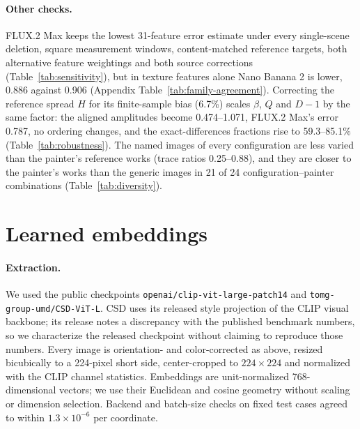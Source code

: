 \paragraph{Other checks.} FLUX.2 Max keeps the lowest 31-feature error estimate under every
single-scene deletion, square measurement windows, content-matched reference targets, both
alternative feature weightings and both source corrections (Table~\ref{tab:sensitivity}),
but in texture features alone Nano Banana 2 is lower, 0.886 against 0.906 (Appendix
Table~\ref{tab:family-agreement}). Correcting the reference spread $H$ for its finite-sample bias
(6.7\%) scales $\beta$, $Q$ and $D-1$ by the same factor: the aligned amplitudes become
0.474--1.071, FLUX.2 Max's error 0.787, no ordering changes, and the exact-differences fractions
rise to 59.3--85.1\% (Table~\ref{tab:robustness}). The named images of every configuration
are less varied than the painter's reference works (trace ratios 0.25--0.88), and they are closer
to the painter's works than the generic images in 21 of 24 configuration--painter combinations
(Table~\ref{tab:diversity}).

\FloatBarrier
\section{Learned embeddings}\label{app:learned}

\paragraph{Extraction.} We used the public checkpoints
\texttt{openai/\allowbreak clip-\allowbreak vit-\allowbreak large-\allowbreak patch14} and
\texttt{tomg-\allowbreak group-\allowbreak umd/\allowbreak CSD-\allowbreak ViT-\allowbreak L}. CSD uses its released style projection of the CLIP visual
backbone; its release notes a discrepancy with the published benchmark numbers, so we
characterize the released checkpoint without claiming to reproduce those numbers. Every image
is orientation- and color-corrected as above, resized bicubically to a 224-pixel short side,
center-cropped to $224\times224$ and normalized with the CLIP channel statistics. Embeddings
are unit-normalized 768-dimensional vectors; we use their Euclidean and cosine geometry without
scaling or dimension selection. Backend and batch-size checks on fixed test cases agreed to
within $1.3\times10^{-6}$ per coordinate.


